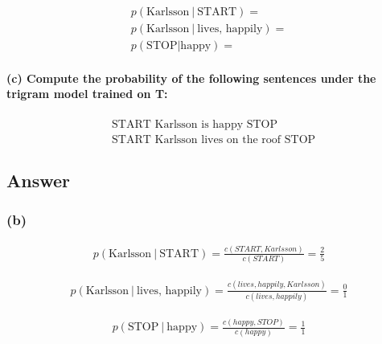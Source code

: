\documentclass{article}
\newcommand\given[1][]{\:#1\vert\:}
\begin{document}
\begin{equation*}
    \begin{split}
    p(\text{Karlsson} \given \text{START})=\\
    p(\text{Karlsson} \given \text{lives, happily})=\\
    p(\text{STOP}|\text{happy})=
    \end{split}
\end{equation*}

\paragraph{(c) Compute the probability of the following sentences under the trigram model trained on T:}

\begin{equation*}
    \begin{split}
    &\text{START Karlsson is happy STOP}\\
    &\text{START Karlsson lives on the roof STOP}
    \end{split}
\end{equation*}

\subsection*{Answer}

\subsubsection*{(b)}

\begin{equation*}
    \begin{split}
    p(\text{Karlsson} \given \text{START}) = \frac{c(START, Karlsson)}{c(START)} = \frac{2}{5}
    \end{split}
\end{equation*}

\begin{equation*}
    \begin{split}
    p(\text{Karlsson} \given \text{lives, happily}) = \frac{c(lives, happily, Karlsson)}{c(lives, happily)} = \frac{0}{1}
    \end{split}
\end{equation*}


\begin{equation*}
    \begin{split}
    p(\text{STOP} \given \text{happy}) = \frac{c(happy, STOP)}{c(happy)} = \frac{1}{1}
    \end{split}
\end{equation*}
\end{document}
